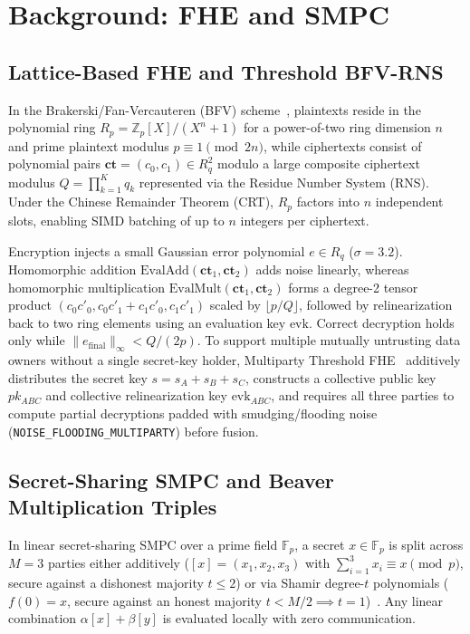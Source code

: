 \documentclass[conference]{IEEEtran}
\begin{document}
\section{Background: FHE and SMPC}
\subsection{Lattice-Based FHE and Threshold BFV-RNS}
In the Brakerski/Fan-Vercauteren (BFV) scheme~\cite{bfv2012}, plaintexts reside in the polynomial ring $R_p = \mathbb{Z}_p[X]/(X^n+1)$ for a power-of-two ring dimension $n$ and prime plaintext modulus $p \equiv 1 \pmod{2n}$, while ciphertexts consist of polynomial pairs $\mathbf{ct} = (c_0, c_1) \in R_q^2$ modulo a large composite ciphertext modulus $Q = \prod_{k=1}^K q_k$ represented via the Residue Number System (RNS). Under the Chinese Remainder Theorem (CRT), $R_p$ factors into $n$ independent slots, enabling SIMD batching of up to $n$ integers per ciphertext.

Encryption injects a small Gaussian error polynomial $e \in R_q$ ($\sigma = 3.2$). Homomorphic addition $\text{EvalAdd}(\mathbf{ct}_1, \mathbf{ct}_2)$ adds noise linearly, whereas homomorphic multiplication $\text{EvalMult}(\mathbf{ct}_1, \mathbf{ct}_2)$ forms a degree-2 tensor product $(c_0 c'_0, c_0 c'_1 + c_1 c'_0, c_1 c'_1)$ scaled by $\lfloor p/Q \rfloor$, followed by relinearization back to two ring elements using an evaluation key $\text{evk}$. Correct decryption holds only while $\|e_{\text{final}}\|_\infty < Q / (2p)$. To support multiple mutually untrusting data owners without a single secret-key holder, Multiparty Threshold FHE~\cite{mouchet2021} additively distributes the secret key $s = s_A + s_B + s_C$, constructs a collective public key $pk_{ABC}$ and collective relinearization key $\text{evk}_{ABC}$, and requires all three parties to compute partial decryptions padded with smudging/flooding noise (\texttt{NOISE\_FLOODING\_MULTIPARTY}) before fusion.

\subsection{Secret-Sharing SMPC and Beaver Multiplication Triples}
In linear secret-sharing SMPC over a prime field $\mathbb{F}_p$, a secret $x \in \mathbb{F}_p$ is split across $M=3$ parties either additively ($[x] = (x_1, x_2, x_3)$ with $\sum_{i=1}^3 x_i \equiv x \pmod p$, secure against a dishonest majority $t \le 2$) or via Shamir degree-$t$ polynomials ($f(0)=x$, secure against an honest majority $t < M/2 \implies t=1$)~\cite{shamir1979}. Any linear combination $\alpha [x] + \beta [y]$ is evaluated locally with zero communication.
\end{document}
